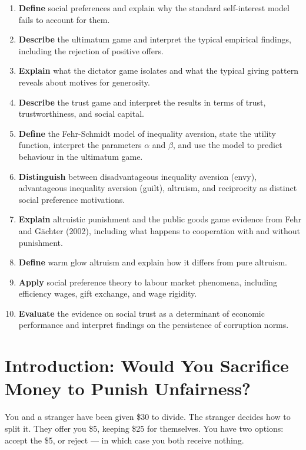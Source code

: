 \documentclass[12pt, letterpaper]{article}
\begin{document}
\begin{enumerate}
\item \textbf{Define} social preferences and explain why the standard self-interest model fails to account for them.
\item \textbf{Describe} the ultimatum game and interpret the typical empirical findings, including the rejection of positive offers.
\item \textbf{Explain} what the dictator game isolates and what the typical giving pattern reveals about motives for generosity.
\item \textbf{Describe} the trust game and interpret the results in terms of trust, trustworthiness, and social capital.
\item \textbf{Define} the Fehr-Schmidt model of inequality aversion, state the utility function, interpret the parameters $\alpha$ and $\beta$, and use the model to predict behaviour in the ultimatum game.
\item \textbf{Distinguish} between disadvantageous inequality aversion (envy), advantageous inequality aversion (guilt), altruism, and reciprocity as distinct social preference motivations.
\item \textbf{Explain} altruistic punishment and the public goods game evidence from Fehr and Gächter (2002), including what happens to cooperation with and without punishment.
\item \textbf{Define} warm glow altruism and explain how it differs from pure altruism.
\item \textbf{Apply} social preference theory to labour market phenomena, including efficiency wages, gift exchange, and wage rigidity.
\item \textbf{Evaluate} the evidence on social trust as a determinant of economic performance and interpret findings on the persistence of corruption norms.
\end{enumerate}

\newpage


\section*{Introduction: Would You Sacrifice Money to Punish Unfairness?}


You and a stranger have been given \$30 to divide. The stranger decides how to split it. They offer you \$5, keeping \$25 for themselves. You have two options: accept the \$5, or reject --- in which case you both receive nothing.
\end{document}
